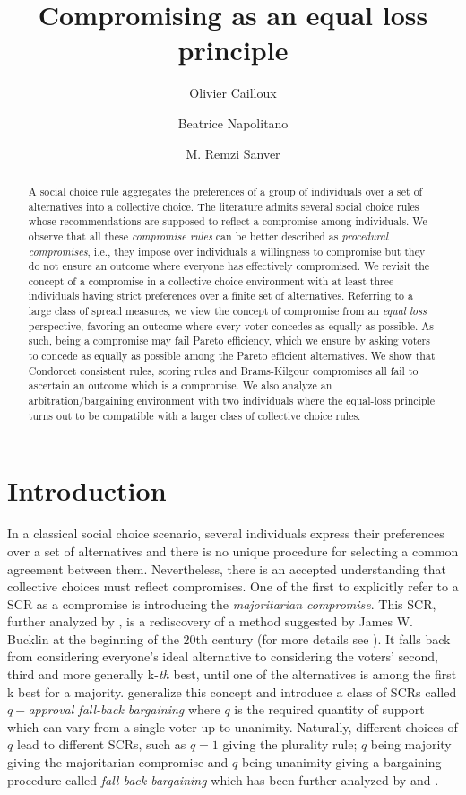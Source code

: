 \documentclass[version=3.21, pagesize, twoside=off, bibliography=totoc, DIV=calc, fontsize=12pt, a4paper]{scrartcl}
\title{Compromising as an equal loss principle}
\author{Olivier Cailloux}
\author{Beatrice Napolitano}
\author{M. Remzi Sanver}
\affil{Université Paris-Dauphine, Université PSL, CNRS, LAMSADE\\
	\href{mailto:@dauphine.fr}{name.lastname@dauphine.fr}
}
\begin{document}
\maketitle

\begin{abstract}
	A social choice rule aggregates the preferences of a group of individuals over a set of alternatives into a collective choice. The literature admits several social choice rules whose recommendations are supposed to reflect a compromise among individuals. We observe that all these \textit{compromise rules} can be better described as \emph{procedural compromises}, i.e., they impose over individuals a willingness to compromise but they do not ensure an outcome where everyone has effectively compromised. We revisit the concept of a compromise in a collective choice environment with at least three individuals having strict preferences over a finite set of alternatives. Referring to a large class of spread measures, we view the concept of compromise from an \emph{equal loss} perspective, favoring an outcome where every voter concedes as equally as possible. As such, being a compromise may fail Pareto efficiency, which we ensure by asking voters to concede as equally as possible among the Pareto efficient alternatives. We show that Condorcet consistent rules, scoring rules and Brams-Kilgour compromises all fail to ascertain an outcome which is a compromise. We also analyze an arbitration/bargaining environment with two individuals where the equal-loss principle turns out to be compatible with a larger class of collective choice rules.
\end{abstract}

\section{Introduction}
\label{sec:introduction}
In a classical social choice scenario, several individuals express their preferences over a set of alternatives and there is no unique procedure for selecting a common agreement between them. Nevertheless, there is an accepted understanding that collective choices must reflect compromises. One of the first to explicitly refer to a \ac{SCR} as a compromise is \citet{Sertel1986} introducing the \textit{majoritarian compromise}. This \ac{SCR}, further analyzed by \citet{Sertel1999}, is a rediscovery of a method suggested by James W. Bucklin at the beginning of the 20th century (for more details see \citet{Erdelyi2015}). It falls back from considering everyone’s ideal alternative to considering the voters’ second, third and more generally k-\emph{th} best, until one of the alternatives is among the first k best for a majority. \citet{Brams2001} generalize this concept and introduce a class of \acp{SCR} called $q-$\textit{approval fall-back bargaining }where $q$ is the required quantity of support which can vary from a single voter up to unanimity. Naturally, different choices of $q$ lead to different \acp{SCR}, such as $q=1$ giving the plurality rule; $q$ being majority giving the majoritarian compromise and $q$ being unanimity giving a bargaining procedure called \textit{fall-back bargaining} which has been further analyzed by \citet{Kibris2007} and \citet{Congar2012}. 
\end{document}
